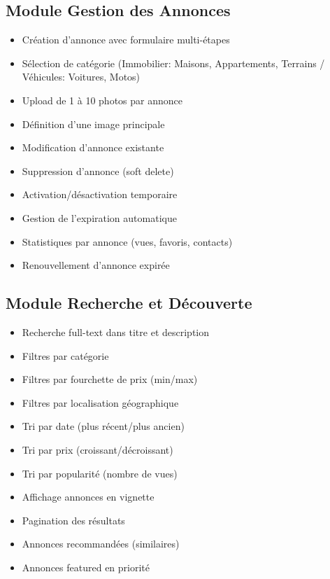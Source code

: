 \documentclass[12pt,a4paper]{report}
\begin{document}
\subsection{Module Gestion des Annonces}
\begin{itemize}
    \item Création d'annonce avec formulaire multi-étapes
    \item Sélection de catégorie (Immobilier: Maisons, Appartements, Terrains / Véhicules: Voitures, Motos)
    \item Upload de 1 à 10 photos par annonce
    \item Définition d'une image principale
    \item Modification d'annonce existante
    \item Suppression d'annonce (soft delete)
    \item Activation/désactivation temporaire
    \item Gestion de l'expiration automatique
    \item Statistiques par annonce (vues, favoris, contacts)
    \item Renouvellement d'annonce expirée
\end{itemize}

\subsection{Module Recherche et Découverte}
\begin{itemize}
    \item Recherche full-text dans titre et description
    \item Filtres par catégorie
    \item Filtres par fourchette de prix (min/max)
    \item Filtres par localisation géographique
    \item Tri par date (plus récent/plus ancien)
    \item Tri par prix (croissant/décroissant)
    \item Tri par popularité (nombre de vues)
    \item Affichage annonces en vignette
    \item Pagination des résultats
    \item Annonces recommandées (similaires)
    \item Annonces featured en priorité
\end{itemize}
\end{document}
